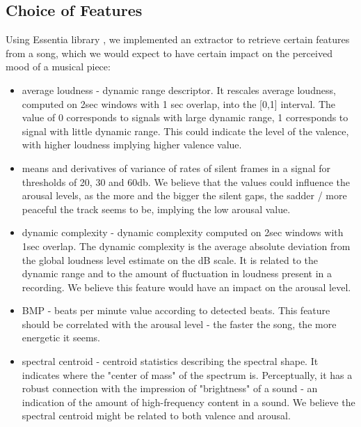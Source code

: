 \subsection{Choice of Features}
Using Essentia library \cite{essentia}, we implemented an extractor to retrieve certain features from a song, which we would expect to have certain impact on the perceived mood of a musical piece:
\begin{itemize}

\item average loudness - dynamic range descriptor. It rescales average loudness, computed on 2sec windows with 1 sec overlap, into the [0,1] interval. The value of 0 corresponds to signals with large dynamic range, 1 corresponds to signal with little dynamic range. This could indicate the level of the valence, with higher loudness implying higher valence value.

\item means and derivatives of variance of rates of silent frames in a signal for thresholds of 20, 30 and 60db. We believe that the values could influence the arousal levels, as the more and the bigger the silent gaps, the sadder / more peaceful the track seems to be, implying the low arousal value.

\item dynamic complexity - dynamic complexity computed on 2sec windows with 1sec overlap. The dynamic complexity is the average absolute deviation from the global loudness level estimate on the dB scale. It is related to the dynamic range and to the amount of fluctuation in loudness present in a recording. We believe this feature would have an impact on the arousal level.

\item BMP - beats per minute value according to detected beats. This feature should be correlated with the arousal level - the faster the song, the more energetic it seems. 

\item spectral centroid - centroid statistics describing the spectral shape. It indicates where the "center of mass" of the spectrum is. Perceptually, it has a robust connection with the impression of "brightness" of a sound - an indication of the amount of high-frequency content in a sound. We believe the spectral centroid might be related to both valence and arousal.


\end{itemize}
